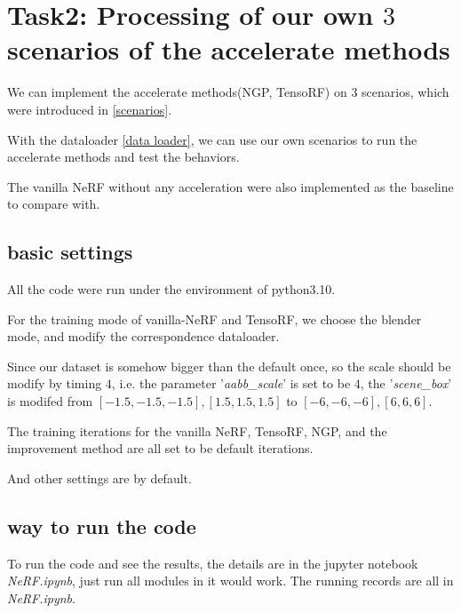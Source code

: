 \section{Task2: Processing of our own $3$ scenarios of the accelerate methods}

We can implement the accelerate methods(NGP, TensoRF) on $3$ scenarios, which were introduced in \ref{scenarios}.

With the dataloader \ref{data loader}, we can use our own scenarios to run the accelerate methods and test the behaviors.

The vanilla NeRF without any acceleration \cite{nerf_pytorch} were also implemented as the baseline to compare with.

\subsection{basic settings}
\label{basic settings}

All the code were run under the environment of python3.10.

For the training mode of vanilla-NeRF and TensoRF, we choose the blender mode, and modify the correspondence dataloader.

Since our dataset is somehow bigger than the default once, so the scale should be modify by timing $4$, i.e. the parameter '\textit{aabb\_scale}' is set to be $4$, the '\textit{scene\_box}' is modifed from $[-1.5,-1.5,-1.5],[1.5,1.5,1.5]$ to $[-6,-6,-6],[6,6,6]$.

The training iterations for the vanilla NeRF, TensoRF, NGP, and the improvement method are all set to be default iterations. 

And other settings are by default.

\subsection{way to run the code}
\label{way to run code}

To run the code and see the results, the details are in the jupyter notebook \textit{NeRF.ipynb}, just run all modules in it would work. The running records are all in \textit{NeRF.ipynb}.

